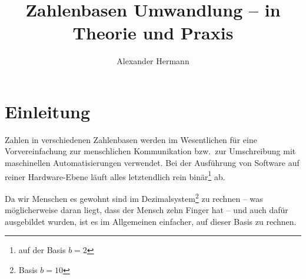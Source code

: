\documentclass[a4paper,12pt,twoside]{book}
\title{Zahlenbasen Umwandlung -- in Theorie und Praxis}
\author{Alexander Hermann}
\begin{document}
\maketitle
\tableofcontents
\lstlistoflistings 
\listoffigures

\chapter{Einleitung}
Zahlen in verschiedenen Zahlenbasen werden im Wesentlichen für eine Vorvereinfachung zur menschlichen Kommunikation bzw.\ zur Umschreibung mit maschinellen Automatisierungen verwendet. 
Bei der Ausführung von Software auf reiner Hardware-Ebene läuft alles letztendlich rein binär\footnote{auf der Basis $b = 2$} ab. 

Da wir Menschen es gewohnt sind im Dezimalsystem\footnote{Basis $b = 10$} zu rechnen -- was möglicherweise daran liegt, dass der Mensch zehn Finger hat -- und auch dafür ausgebildet wurden, ist es im Allgemeinen einfacher, auf dieser Basis zu rechnen.
\end{document}
